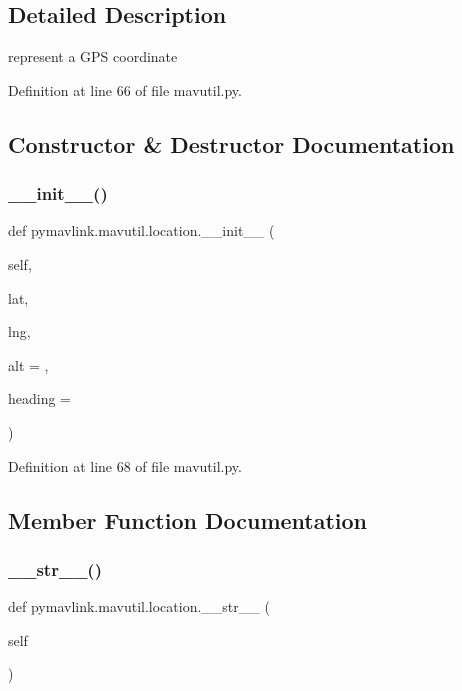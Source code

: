 \subsection{Detailed Description}
\begin{DoxyVerb}represent a GPS coordinate\end{DoxyVerb}
 

Definition at line 66 of file mavutil.\+py.



\subsection{Constructor \& Destructor Documentation}
\mbox{\label{classpymavlink_1_1mavutil_1_1location_a05f23187a42be511f0c0c50c2b15de94}} 
\subsubsection{\texorpdfstring{\_\_init\_\_()}{\_\_init\_\_()}}
{\footnotesize\ttfamily def pymavlink.\+mavutil.\+location.\+\_\+\+\_\+init\+\_\+\+\_\+ (\begin{DoxyParamCaption}\item[{}]{self,  }\item[{}]{lat,  }\item[{}]{lng,  }\item[{}]{alt = {},  }\item[{}]{heading = {} }\end{DoxyParamCaption})}



Definition at line 68 of file mavutil.\+py.



\subsection{Member Function Documentation}
\mbox{\label{classpymavlink_1_1mavutil_1_1location_a1ac1d1a6d3fc7c28970bea2912213efb}} 
\subsubsection{\texorpdfstring{\_\_str\_\_()}{\_\_str\_\_()}}
{\footnotesize\ttfamily def pymavlink.\+mavutil.\+location.\+\_\+\+\_\+str\+\_\+\+\_\+ (\begin{DoxyParamCaption}\item[{}]{self }\end{DoxyParamCaption})}



